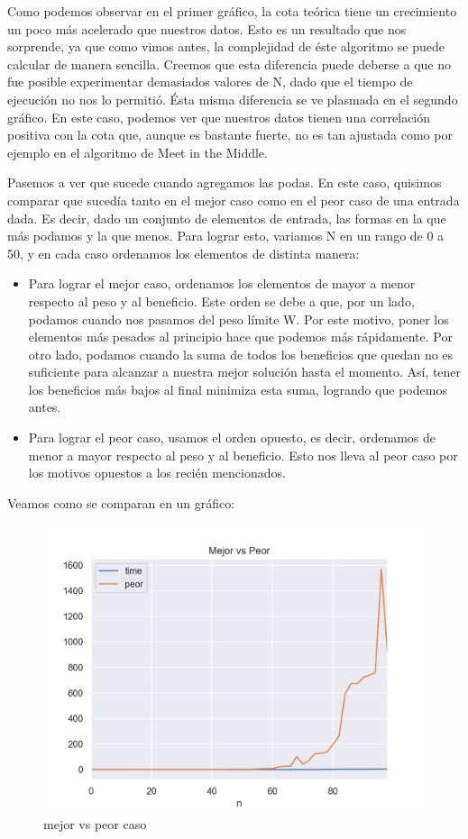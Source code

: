 Como podemos observar en el primer gráfico, la cota teórica tiene un crecimiento un poco más acelerado que nuestros datos. Esto es un resultado que nos sorprende, ya que como vimos antes, la complejidad de éste algoritmo se puede calcular de manera sencilla. Creemos que esta diferencia puede deberse a que no fue posible experimentar demasiados valores de N, dado que el tiempo de ejecución no nos lo permitió.
\newline
Ésta misma diferencia se ve plasmada en el segundo gráfico. En este caso, podemos ver que nuestros datos tienen una correlación positiva con la cota que, aunque es bastante fuerte, no es tan ajustada como por ejemplo en el algoritmo de Meet in the Middle.

\bigskip

Pasemos a ver que sucede cuando agregamos las podas. En este caso, quisimos comparar que sucedía tanto en el mejor caso como en el peor caso de una entrada dada. Es decir, dado un conjunto de elementos de entrada, las formas en la que más podamos y la que menos. Para lograr esto, variamos N en un rango de 0 a 50, y en cada caso ordenamos los elementos de distinta manera:
\begin{itemize}
\item Para lograr el mejor caso, ordenamos los elementos de mayor a menor respecto al peso y al beneficio. Este orden se debe a que, por un lado, podamos cuando nos pasamos del peso límite W. Por este motivo, poner los elementos más pesados al principio hace que podemos más rápidamente. Por otro lado, podamos cuando la suma de todos los beneficios que quedan no es suficiente para alcanzar a nuestra mejor solución hasta el momento. Así, tener los beneficios más bajos al final minimiza esta suma, logrando que podemos antes.
\item Para lograr el peor caso, usamos el orden opuesto, es decir, ordenamos de menor a mayor respecto al peso y al beneficio. Esto nos lleva al peor caso por los motivos opuestos a los recién mencionados.
\end{itemize}

Veamos como se comparan en un gráfico:


\begin{figure}[!htb]
   \begin{minipage}{0.8\textwidth}
     \centering
     \includegraphics[width=0.7\linewidth]{img/mejor_peor_1}
     \caption{mejor vs peor caso}
   \end{minipage}
\end{figure}

